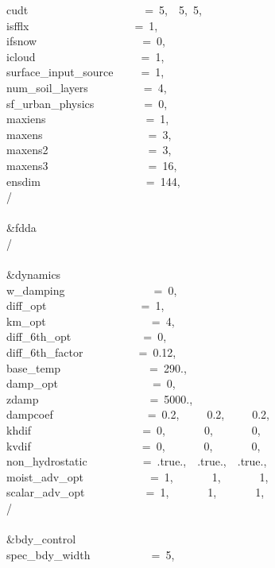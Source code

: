 cudt~~~~~~~~~~~~~~~~~~~~~=~5,~~5,~5,~\\
isfflx~~~~~~~~~~~~~~~~~~~=~1,\\
ifsnow~~~~~~~~~~~~~~~~~~~=~0,\\
icloud~~~~~~~~~~~~~~~~~~~=~1,\\
surface\_input\_source~~~~~=~1,\\
num\_soil\_layers~~~~~~~~~~=~4,\\
sf\_urban\_physics~~~~~~~~~=~0,~~\\
maxiens~~~~~~~~~~~~~~~~~~=~1,\\
maxens~~~~~~~~~~~~~~~~~~~=~3,\\
maxens2~~~~~~~~~~~~~~~~~~=~3,\\
maxens3~~~~~~~~~~~~~~~~~~=~16,\\
ensdim~~~~~~~~~~~~~~~~~~~=~144,\\
/\\
\\
\&fdda~~~~~~~~~~~~~~~~~~~~\\
/\\
\\
\&dynamics~~~~~~~~~~~~~~~~\\
w\_damping~~~~~~~~~~~~~~~~=~0,\\
diff\_opt~~~~~~~~~~~~~~~~~=~1,\\
km\_opt~~~~~~~~~~~~~~~~~~~=~4,\\
diff\_6th\_opt~~~~~~~~~~~~~=~0,~~~~~~~~\\
diff\_6th\_factor~~~~~~~~~~=~0.12,~~~~~\\
base\_temp~~~~~~~~~~~~~~~~=~290.,\\
damp\_opt~~~~~~~~~~~~~~~~~=~0,\\
zdamp~~~~~~~~~~~~~~~~~~~~=~5000.,~~~~\\
dampcoef~~~~~~~~~~~~~~~~~=~0.2,~~~~~0.2,~~~~~0.2,~~~~~~~~\\
khdif~~~~~~~~~~~~~~~~~~~~=~0,~~~~~~~0,~~~~~~~0,~~~~~~~~~~\\
kvdif~~~~~~~~~~~~~~~~~~~~=~0,~~~~~~~0,~~~~~~~0,~~~~~~~~~~\\
non\_hydrostatic~~~~~~~~~~=~.true.,~~.true.,~~.true.,~~~~~\\
moist\_adv\_opt~~~~~~~~~~~~=~1,~~~~~~~1,~~~~~~~1,~~~~~~~~~~\\
scalar\_adv\_opt~~~~~~~~~~~=~1,~~~~~~~1,~~~~~~~1,~~~~~~~~~~\\
/\\
\\
\&bdy\_control~~~~~~~~~~~~~\\
spec\_bdy\_width~~~~~~~~~~~=~5,\\
